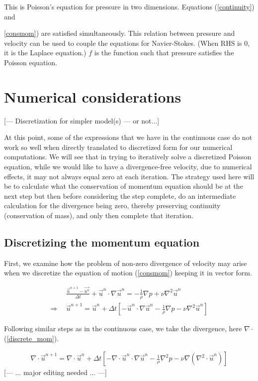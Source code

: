 \documentclass[11pt]{article}
\begin{document}
This is Poisson's equation for pressure in two dimensions. Equations (\ref{continuity}) and {\ref{consmom}) are satisfied simultaneously.
This relation between pressure and velocity can be used
to couple the equations for Navier-Stokes. (When RHS is 0, it is the Laplace equation.) $f$ is the function such that pressure satisfies the Poisson
equation.


\section{Numerical considerations}

[--- Discretization for simpler model(s) --- or not...]


At this point, some of the expressions that we have in the continuous case do not work so well
when directly translated to discretized form for our numerical computations.
We will see that in trying to iteratively solve a discretized Poisson equation, while we would
like to have a divergence-free velocity,
due to numerical effects, it may not always equal zero at each iteration. The strategy used
here will be to calculate what the conservation of momentum equation should be at the next step
but then before considering the step complete, do an intermediate calculation for the divergence
being zero, thereby preserving continuity (conservation of mass), and only then complete that
iteration.

\subsection{Discretizing the momentum equation}
First, we examine how the problem of non-zero divergence of velocity may arise when we
discretize the equation of motion (\ref{consmom}) keeping it in vector form.

\begin{align}
& \frac{\vec{u}^{n+1} - \vec{u^n}}{\Delta t} + \vec{u}^n \cdot \nabla \vec{u}^n
 = -\frac{1}{\rho} \nabla p + \nu \nabla^2 \vec{u}^n \nonumber \\
\Rightarrow ~~&
\vec{u}^{n+1} = \vec{u}^n + \Delta t \left[ -\vec{u}^n \cdot \nabla \vec{u}^n
			  - \frac{1}{\rho} \nabla p - \nu \nabla^2 \vec{u}^n \right]
\label{discrete_mom}
\end{align}

Following similar steps as in the continuous case, we take the divergence,
here $\nabla \cdot$(\ref{discrete_mom}).

\begin{align}
\nabla \cdot \vec{u}^{n+1} = \nabla \cdot \vec{u}^n
 + \Delta t \left[ -\nabla \cdot \vec{u}^n \cdot \nabla \vec{u}^n
			      - \frac{1}{\rho} \nabla^2 p - \nu \nabla (\nabla^2 \cdot \vec{u}^n) \right]
\label{diverged_mom}
\end{align}
[--- ... major editing needed ... ---]

}
\end{document}
